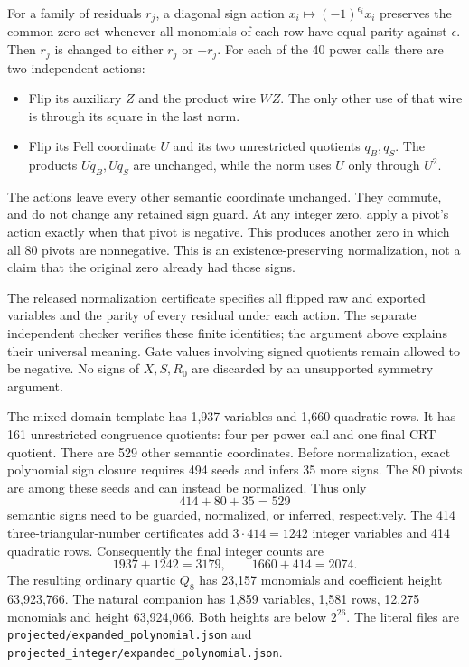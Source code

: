 \documentclass[11pt]{article}
\begin{document}
For a family of residuals $r_j$, a diagonal sign action
$x_i\mapsto(-1)^{\epsilon_i}x_i$ preserves the common zero set whenever
all monomials of each row have equal parity against $\epsilon$.
Then $r_j$ is changed to either $r_j$ or $-r_j$.
For each of the 40 power calls there are two independent actions:
\begin{itemize}
\item Flip its auxiliary $Z$ and the product wire $WZ$.  The only other
      use of that wire is through its square in the last norm.
\item Flip its Pell coordinate $U$ and its two unrestricted quotients
      $q_B,q_S$.  The products $Uq_B,Uq_S$ are unchanged, while the norm
      uses $U$ only through $U^2$.
\end{itemize}
The actions leave every other semantic coordinate unchanged.  They
commute, and do not change any retained sign guard.  At any integer zero,
apply a pivot's action exactly when that pivot is negative.  This produces
another zero in which all 80 pivots are nonnegative.  This is an
existence-preserving normalization, not a claim that the original zero
already had those signs.

The released normalization certificate specifies all flipped raw and
exported variables and the parity of every residual under each action.
The separate independent checker verifies these finite identities; the
argument above explains their universal meaning.  Gate values involving
signed quotients remain allowed to be negative.  No signs of $X,S,R_0$
are discarded by an unsupported symmetry argument.

The mixed-domain template has 1,937 variables and 1,660 quadratic rows.
It has 161 unrestricted congruence quotients: four per power call and
one final CRT quotient.  There are 529 other semantic coordinates.
Before normalization, exact polynomial sign closure requires 494 seeds
and infers 35 more signs.  The 80 pivots are among these seeds and can
instead be normalized.  Thus only
\[
 414+80+35=529
\]
semantic signs need to be guarded, normalized, or inferred, respectively.
The 414 three-triangular-number certificates add $3\cdot414=1242$
integer variables and 414 quadratic rows.  Consequently the final
integer counts are
\[
 1937+1242=3179,\qquad 1660+414=2074.
\]
The resulting ordinary quartic $Q_8$ has 23,157 monomials and coefficient
height 63,923,766.  The natural companion has 1,859 variables, 1,581 rows,
12,275 monomials and height 63,924,066.  Both heights are below $2^{26}$.
The literal files are \texttt{projected/expanded\_polynomial.json} and
\texttt{projected\_integer/expanded\_polynomial.json}.
\end{document}
